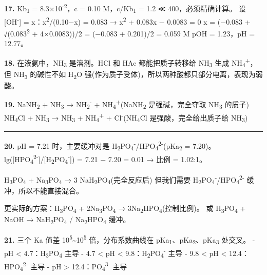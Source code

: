 \documentclass[a4paper,11pt]{ctexart}
\begin{document}
\textbf{17.} Kb\textsubscript{1} = 8.3×10\textsuperscript{-2}，c = 0.10 M，c/Kb\textsubscript{1} = 1.2 ≪ 400，必须精确计算。
设 {[}OH\textsuperscript{-}{]} = x：x\textsuperscript{2}/(0.10−x) = 0.083 → x\textsuperscript{2} + 0.083x − 0.0083 = 0
x = (−0.083 + √(0.083\textsuperscript{2} + 4×0.0083))/2 = (−0.083 + 0.201)/2 = 0.059 M
pOH = 1.23，pH = 12.77。

\textbf{18.} 在液氨中，NH\textsubscript{3} 是溶剂。HCl 和 HAc 都能把质子转移给 NH\textsubscript{3} 生成 NH\textsubscript{4}\textsuperscript{+}，但 NH\textsubscript{3} 的碱性不如 H\textsubscript{2}O 强(作为质子受体)，所以两种酸都只部分电离，表现为弱酸。

\textbf{19.} NaNH\textsubscript{2} + NH\textsubscript{3} → NH\textsubscript{2}\textsuperscript{-} + NH\textsubscript{4}\textsuperscript{+}(NaNH\textsubscript{2} 是强碱，完全夺取 NH\textsubscript{3} 的质子)
NH\textsubscript{4}Cl + NH\textsubscript{3} → NH\textsubscript{3} + NH\textsubscript{4}\textsuperscript{+} + Cl\textsuperscript{-}(NH\textsubscript{4}Cl 是强酸，完全给出质子给 NH\textsubscript{3})

\begin{center}\rule{0.5\linewidth}{0.5pt}\end{center}

\textbf{20.} pH = 7.21 时，主要缓冲对是 H\textsubscript{2}PO\textsubscript{4}\textsuperscript{-}/HPO\textsubscript{4}\textsuperscript{2-}(pKa\textsubscript{2} = 7.20)。
lg({[}HPO\textsubscript{4}\textsuperscript{2-}{]}/{[}H\textsubscript{2}PO\textsubscript{4}\textsuperscript{-}{]}) = 7.21 − 7.20 = 0.01 → 比例 = 1.02:1。

H\textsubscript{3}PO\textsubscript{4} + Na\textsubscript{3}PO\textsubscript{4} → 3 NaH\textsubscript{2}PO\textsubscript{4}(完全反应后)
但我们需要 H\textsubscript{2}PO\textsubscript{4}\textsuperscript{-}/HPO\textsubscript{4}\textsuperscript{2-} 缓冲，所以不能直接混合。

更实际的方案：H\textsubscript{3}PO\textsubscript{4} + 2Na\textsubscript{3}PO\textsubscript{4} → 3Na\textsubscript{2}HPO\textsubscript{4}(控制比例)。
或 H\textsubscript{3}PO\textsubscript{4} + NaOH → NaH\textsubscript{2}PO\textsubscript{4} / Na\textsubscript{2}HPO\textsubscript{4} 缓冲。

\textbf{21.} 三个 Ka 值差 10\textsuperscript{5}\textasciitilde10\textsuperscript{5} 倍，分布系数曲线在 pKa\textsubscript{1}、pKa\textsubscript{2}、pKa\textsubscript{3} 处交叉。
- pH \textless{} 4.7：H\textsubscript{3}PO\textsubscript{4} 主导
- 4.7 \textless{} pH \textless{} 9.8：H\textsubscript{2}PO\textsubscript{4}\textsuperscript{-} 主导
- 9.8 \textless{} pH \textless{} 12.4：HPO\textsubscript{4}\textsuperscript{2-} 主导
- pH \textgreater{} 12.4：PO\textsubscript{4}\textsuperscript{3-} 主导
\end{document}
